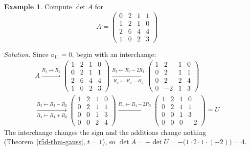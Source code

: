 \documentclass[12pt]{article}
\theoremstyle{definition}
\newtheorem{example}[theorem]{Example}
\begin{document}
\begin{example}\label{r5d-exm-rowred-swap}
Compute \(\det A\) for
\[
A=\begin{pmatrix}0&2&1&1\\1&2&1&0\\2&6&4&4\\1&0&2&3\end{pmatrix}
\]

\textit{Solution.} Since \(a_{11}=0\), begin with an interchange:
\[
\begin{gathered}
A\xrightarrow{R_1\leftrightarrow R_2}
\begin{pmatrix}1&2&1&0\\0&2&1&1\\2&6&4&4\\1&0&2&3\end{pmatrix}
\xrightarrow[R_4\leftarrow R_4-R_1]{R_3\leftarrow R_3-2R_1}
\begin{pmatrix}1&2&1&0\\0&2&1&1\\0&2&2&4\\0&-2&1&3\end{pmatrix}
\\
\xrightarrow[R_4\leftarrow R_4+R_2]{R_3\leftarrow R_3-R_2}
\begin{pmatrix}1&2&1&0\\0&2&1&1\\0&0&1&3\\0&0&2&4\end{pmatrix}
\xrightarrow{R_4\leftarrow R_4-2R_3}
\begin{pmatrix}1&2&1&0\\0&2&1&1\\0&0&1&3\\0&0&0&-2\end{pmatrix}=U
\end{gathered}
\]
The interchange changes the sign and the additions change nothing (Theorem~\ref{r5d-thm-gauss}, \(t=1\)), so
\(\det A=-\det U=-\bigl(1\cdot2\cdot1\cdot(-2)\bigr)=4\).
\end{example}
\end{document}
